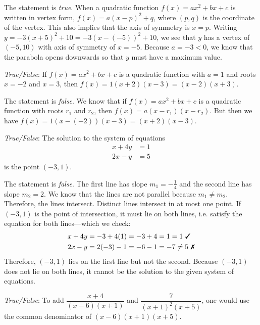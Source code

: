 \documentclass[11pt,letterpaper]{article}
\begin{document}
\sol The statement is \textit{true}. When a quadratic function $f(x)= ax^2 + bx + c$ is written in vertex form, $f(x)= a(x - p)^2 + q$, where $(p, q)$ is the coordinate of the vertex. This also implies that the axis of symmetry is $x= p$. Writing $y= -3(x + 5)^2 + 10= -3(x - (-5))^2 + 10$, we see that $y$ has a vertex of $(-5, 10)$ with axis of symmetry of $x= -5$. Because $a= -3 < 0$, we know that the parabola opens downwards so that $y$ must have a maximum value. \pvspace{1.5cm}



\quizsol \textit{True/False}: If $f(x)= ax^2 + bx + c$ is a quadratic function with $a= 1$ and roots $x= -2$ and $x= 3$, then $f(x)= 1(x + 2)(x - 3)= (x - 2)(x + 3)$. \pspace

\sol The statement is \textit{false}. We know that if $f(x)= ax^2 + bx + c$ is a quadratic function with roots $r_1$ and $r_2$, then $f(x)= a(x - r_1)(x - r_2)$. But then we have $f(x)= 1(x - (-2))(x - 3)= (x + 2)(x - 3)$. 



\newpage



\quizsol \textit{True/False}: The solution to the system of equations
	\[
	\begin{aligned}
	x + 4y&= 1 \\
	2x - y&= 5
	\end{aligned}
	\]
is the point $(-3, 1)$. \pspace

\sol The statement is \textit{false}. The first line has slope $m_1= -\frac{1}{4}$ and the second line has slope $m_2= 2$. We know that the lines are not parallel because $m_1 \neq m_2$. Therefore, the lines intersect. Distinct lines intersect in at most one point. If $(-3, 1)$ is the point of intersection, it must lie on both lines, i.e. satisfy the equation for both lines---which we check:
	\[
	\begin{aligned}
	x + 4y&= -3 + 4(1)= -3 + 4= 1= 1 \text{ \cmark} \\
	2x - y&= 2(-3) - 1= -6 - 1= -7 \neq 5 \text{ \xmark}
	\end{aligned}
	\]
Therefore, $(-3, 1)$ lies on the first line but not the second. Because $(-3, 1)$ does not lie on both lines, it cannot be the solution to the given system of equations. \pvspace{1.5cm}



\quizsol \textit{True/False}: To add $\dfrac{x + 4}{(x - 6)(x + 1)}$ and $\dfrac{7}{(x + 1)^2 (x + 5)}$, one would use the common denominator of $(x - 6)(x + 1)(x + 5)$. \pspace
\end{document}
